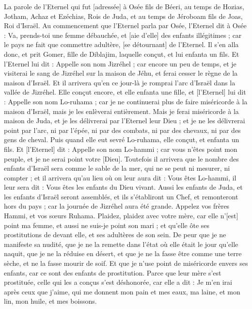 \BFont
\begin{multicols}{2}
\VerseOne{}La parole de l'Eternel qui fut [adressée] à Osée fils de Béeri, au temps de Hozias, Jotham, Achaz et Ezéchias, Rois de Juda, et au temps de Jéroboam fils de Joas, Roi d'Israël.
Au commencement que l'Eternel parla par Osée, l'Eternel dit à Osée : Va, prends-toi une femme débauchée, et [aie d'elle] des enfants illégitimes ; car le pays ne fait que commettre adultère, [se détournant] de l'Eternel.
Il s'en alla donc, et prit Gomer, fille de Diblajim, laquelle conçut, et lui enfanta un fils.
Et l'Eternel lui dit : Appelle son nom Jizréhel ; car encore un peu de temps, et je visiterai le sang de Jizréhel sur la maison de Jéhu, et ferai cesser le règne de la maison d'Israël.
Et il arrivera qu'en ce jour-là je romprai l'arc d'Israël dans la vallée de Jizréhel.
Elle conçut encore, et elle enfanta une fille, et [l'Eternel] lui dit : Appelle son nom Lo-ruhama ; car je ne continuerai plus de faire miséricorde à la maison d'Israël, mais je les enlèverai entièrement.
Mais je ferai miséricorde à la maison de Juda, et je les délivrerai par l'Eternel leur Dieu ; et je ne les délivrerai point par l'arc, ni par l'épée, ni par des combats, ni par des chevaux, ni par des gens de cheval.
Puis quand elle eut sevré Lo-ruhama, elle conçut, et enfanta un fils.
Et [l'Eternel] dit : Appelle son nom Lo-hammi ; car vous n'êtes point mon peuple, et je ne serai point votre [Dieu].
Toutefois il arrivera que le nombre des enfants d'Israël sera comme le sable de la mer, qui ne se peut ni mesurer, ni compter ; et il arrivera qu'au lieu où on leur aura dit : Vous êtes Lo-hammi, il leur sera dit : Vous êtes les enfants du Dieu vivant.
Aussi les enfants de Juda, et les enfants d'Israël seront assemblés, et ils s'établiront un Chef, et remonteront hors du pays ; car la journée de Jizréhel aura été grande.
\VerseOne{}Appelez vos frères Hammi, et vos sœurs Ruhama.
Plaidez, plaidez avec votre mère, car elle n'[est] point ma femme, et aussi ne suis-je point son mari ; et qu'elle ôte ses prostitutions de devant elle, et ses adultères de son sein.
De peur que je ne manifeste sa nudité, que je ne la remette dans l'état où elle était le jour qu'elle naquit, que je ne la réduise en désert, et que je ne la fasse être comme une terre sèche, et ne la fasse mourir de soif.
Et que je n'use point de miséricorde envers ses enfants, car ce sont des enfants de prostitution.
Parce que leur mère s'est prostituée, celle qui les a conçus s'est déshonorée, car elle a dit : Je m'en irai après ceux que j'aime, qui me donnent mon pain et mes eaux, ma laine, et mon lin, mon huile, et mes boissons.

\end{multicols}
